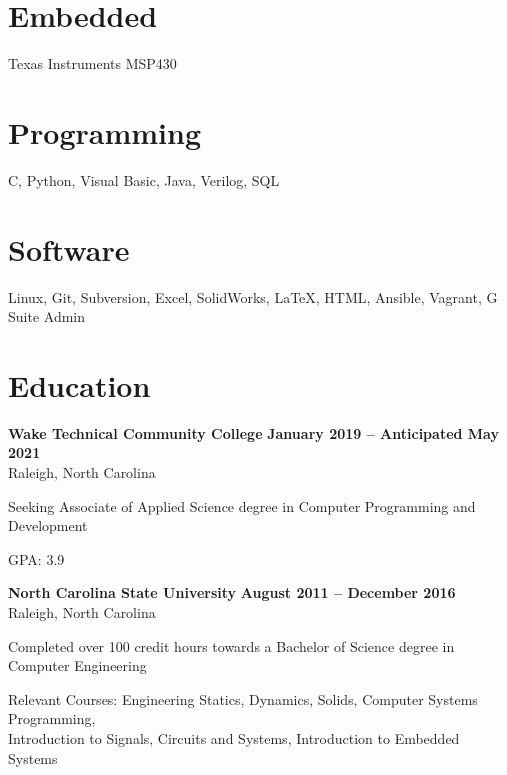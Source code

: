 \documentclass[margin,line]{resume}
\begin{document}
\address{Durham, NC 27704
	\hspace{18mm}
	(704) 799-5153
	\hspace{18mm}
	\href{mailto:jesseaster1@gmail.com}{jesseaster1@gmail.com}
}


\begin{resume}

   
    \section{\mysidestyle Embedded}
    Texas Instruments MSP430
    \vspace{-5mm}
    
    \section{\mysidestyle Programming}
    C, Python, Visual Basic, Java, Verilog, SQL
    \vspace{-5mm}

    \section{\mysidestyle Software}
    Linux, Git, Subversion, Excel, SolidWorks, \LaTeX, HTML, Ansible, Vagrant, G Suite Admin


    \section{\mysidestyle Education}


    \textbf{Wake Technical Community College} \hfill \textbf{January 2019 -- Anticipated May 2021}\\
    Raleigh, North Carolina\\
    \vspace{-4mm}
    \begin{list2}
    \item Seeking Associate of Applied Science degree in Computer Programming and Development
    \item GPA: 3.9
    \end{list2}


    \textbf{North Carolina State University} \hfill \textbf{August 2011 -- December 2016}\\
    Raleigh, North Carolina\\
    \vspace{-4mm}
    \begin{list2}
    \item Completed over 100 credit hours towards a Bachelor of Science degree in Computer Engineering
    \item Relevant Courses: Engineering Statics, Dynamics, Solids, Computer Systems Programming,\\
    Introduction to Signals, Circuits and Systems, Introduction to Embedded Systems
    \end{list2}



\end{resume}
\end{document}
